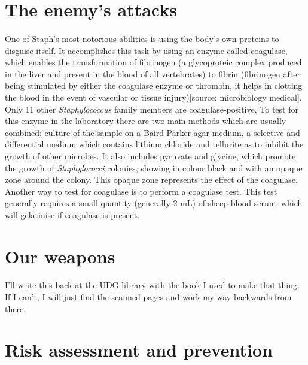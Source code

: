 \section{The enemy's attacks}
\paragraph{}One of Staph's most notorious abilities is using the body's own proteins to disguise itself. It accomplishes this task by using an enzyme called coagulase, which enables the transformation of fibrinogen (a glycoproteic complex produced in the liver and present in the blood of all vertebrates) to fibrin (fibrinogen after being stimulated by either the coagulase enzyme or thrombin, it helps in clotting the blood in the event of vascular or tissue injury)[source: microbiology medical]. Only 11 other \emph{Staphylococcus} family members are coagulase-positive. To test for this enzyme in the laboratory there are two main methods which are usually combined: culture of the sample on a Baird-Parker agar medium, a selective and differential medium which contains lithium chloride and tellurite as to inhibit the growth of other microbes. It also includes pyruvate and glycine, which promote the growth of \emph{Staphylococci} colonies, showing in colour black and with an opaque zone around the colony. This opaque zone represents the effect of the coagulase. Another way to test for coagulase is to perform a coagulase test. This test generally requires a small quantity (generally 2 mL) of sheep blood serum, which will gelatinise if coagulase is present.
\section{Our weapons}
\paragraph{}I'll write this back at the UDG library with the book  I used to make that thing. If I can't, I will just find the scanned pages and work my way backwards from there.
\section{Risk assessment and prevention}
